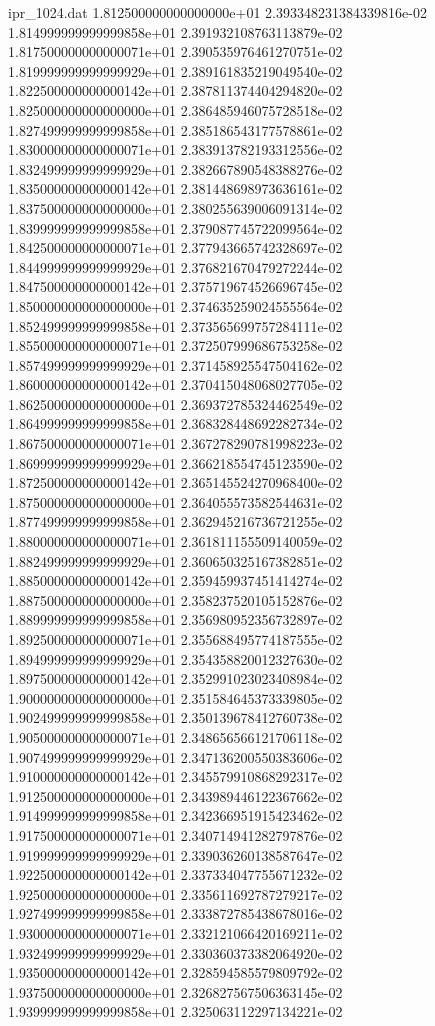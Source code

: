 \begin{filecontents}{ipr_1024.dat}
1.812500000000000000e+01 2.393348231384339816e-02
1.814999999999999858e+01 2.391932108763113879e-02
1.817500000000000071e+01 2.390535976461270751e-02
1.819999999999999929e+01 2.389161835219049540e-02
1.822500000000000142e+01 2.387811374404294820e-02
1.825000000000000000e+01 2.386485946075728518e-02
1.827499999999999858e+01 2.385186543177578861e-02
1.830000000000000071e+01 2.383913782193312556e-02
1.832499999999999929e+01 2.382667890548388276e-02
1.835000000000000142e+01 2.381448698973636161e-02
1.837500000000000000e+01 2.380255639006091314e-02
1.839999999999999858e+01 2.379087745722099564e-02
1.842500000000000071e+01 2.377943665742328697e-02
1.844999999999999929e+01 2.376821670479272244e-02
1.847500000000000142e+01 2.375719674526696745e-02
1.850000000000000000e+01 2.374635259024555564e-02
1.852499999999999858e+01 2.373565699757284111e-02
1.855000000000000071e+01 2.372507999686753258e-02
1.857499999999999929e+01 2.371458925547504162e-02
1.860000000000000142e+01 2.370415048068027705e-02
1.862500000000000000e+01 2.369372785324462549e-02
1.864999999999999858e+01 2.368328448692282734e-02
1.867500000000000071e+01 2.367278290781998223e-02
1.869999999999999929e+01 2.366218554745123590e-02
1.872500000000000142e+01 2.365145524270968400e-02
1.875000000000000000e+01 2.364055573582544631e-02
1.877499999999999858e+01 2.362945216736721255e-02
1.880000000000000071e+01 2.361811155509140059e-02
1.882499999999999929e+01 2.360650325167382851e-02
1.885000000000000142e+01 2.359459937451414274e-02
1.887500000000000000e+01 2.358237520105152876e-02
1.889999999999999858e+01 2.356980952356732897e-02
1.892500000000000071e+01 2.355688495774187555e-02
1.894999999999999929e+01 2.354358820012327630e-02
1.897500000000000142e+01 2.352991023023408984e-02
1.900000000000000000e+01 2.351584645373339805e-02
1.902499999999999858e+01 2.350139678412760738e-02
1.905000000000000071e+01 2.348656566121706118e-02
1.907499999999999929e+01 2.347136200550383606e-02
1.910000000000000142e+01 2.345579910868292317e-02
1.912500000000000000e+01 2.343989446122367662e-02
1.914999999999999858e+01 2.342366951915423462e-02
1.917500000000000071e+01 2.340714941282797876e-02
1.919999999999999929e+01 2.339036260138587647e-02
1.922500000000000142e+01 2.337334047755671232e-02
1.925000000000000000e+01 2.335611692787279217e-02
1.927499999999999858e+01 2.333872785438678016e-02
1.930000000000000071e+01 2.332121066420169211e-02
1.932499999999999929e+01 2.330360373382064920e-02
1.935000000000000142e+01 2.328594585579809792e-02
1.937500000000000000e+01 2.326827567506363145e-02
1.939999999999999858e+01 2.325063112297134221e-02

\end{filecontents}
